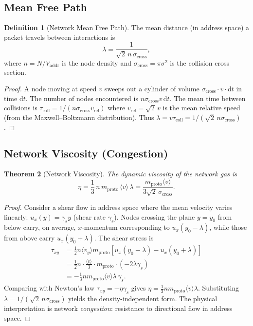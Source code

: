 \documentclass[11pt,twocolumn,a4paper]{article}
\newtheorem{theorem}{Theorem}[section]
\theoremstyle{definition}
\newtheorem{definition}[theorem]{Definition}
\theoremstyle{remark}
\newcommand{\Vaddr}{V_{\mathrm{addr}}}
\newcommand{\mpr}{m_{\mathrm{proto}}}
\newcommand{\dd}{\mathrm{d}}
\newcommand{\avg}[1]{\langle #1 \rangle}
\begin{document}
\subsection{Mean Free Path}\label{sec:mfp}

\begin{definition}[Network Mean Free Path]\label{def:mfp}
The mean distance (in address space) a packet travels between interactions is
\begin{equation}\label{eq:mfp}
  \lambda = \frac{1}{\sqrt{2}\,n\,\sigma_{\mathrm{cross}}},
\end{equation}
where $n=N/\Vaddr$ is the node density and
$\sigma_{\mathrm{cross}}=\pi\sigma^2$ is the collision cross section.
\end{definition}

\begin{proof}
A node moving at speed $v$ sweeps out a cylinder of volume
$\sigma_{\mathrm{cross}}\cdot v\cdot\dd t$ in time $\dd t$.  The number of
nodes encountered is $n\sigma_{\mathrm{cross}}v\,\dd t$.  The mean time
between collisions is $\tau_{\mathrm{coll}}=1/(n\sigma_{\mathrm{cross}}
v_{\mathrm{rel}})$ where $v_{\mathrm{rel}}=\sqrt{2}\,v$ is the mean
relative speed (from the Maxwell--Boltzmann distribution).  Thus
$\lambda=v\tau_{\mathrm{coll}}=1/(\sqrt{2}\,n\sigma_{\mathrm{cross}})$.
\end{proof}

\subsection{Network Viscosity (Congestion)}\label{sec:viscosity}

\begin{theorem}[Network Viscosity]\label{thm:viscosity}
The dynamic viscosity of the network gas is
\begin{equation}\label{eq:viscosity}
  \eta = \frac{1}{3}\,n\,\mpr\,\avg{v}\,\lambda
  = \frac{\mpr\avg{v}}{3\sqrt{2}\,\sigma_{\mathrm{cross}}}.
\end{equation}
\end{theorem}

\begin{proof}
Consider a shear flow in address space where the mean velocity varies
linearly: $u_x(y)=\gamma_s y$ (shear rate $\gamma_s$).  Nodes crossing
the plane $y=y_0$ from below carry, on average, $x$-momentum corresponding
to $u_x(y_0-\lambda)$, while those from above carry $u_x(y_0+\lambda)$.
The shear stress is
\begin{align}
  \tau_{xy} &= \frac{1}{2}n\avg{v_y}\mpr[u_x(y_0-\lambda)-u_x(y_0+\lambda)]
  \nonumber\\
  &= \frac{1}{2}n\cdot\frac{\avg{v}}{3}\cdot\mpr\cdot(-2\lambda\gamma_s)
  \nonumber\\
  &= -\frac{1}{3}n\mpr\avg{v}\lambda\,\gamma_s. \label{eq:visc_deriv}
\end{align}
Comparing with Newton's law $\tau_{xy}=-\eta\gamma_s$ gives
$\eta=\frac{1}{3}n\mpr\avg{v}\lambda$.  Substituting
$\lambda=1/(\sqrt{2}\,n\sigma_{\mathrm{cross}})$ yields the density-independent
form.  The physical interpretation is network \emph{congestion}: resistance
to directional flow in address space.
\end{proof}
\end{document}
